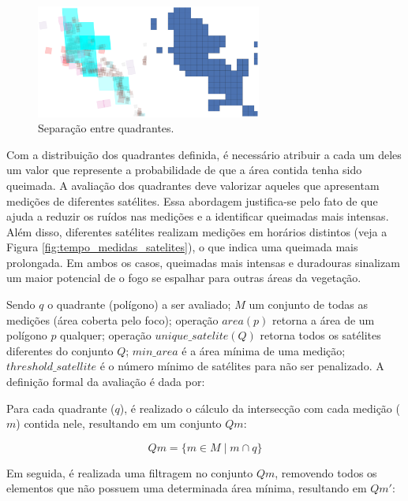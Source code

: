 \documentclass[cic,tc]{iiufrgs}
\begin{document}
\begin{figure}[H]
    \caption{Separação entre quadrantes.}
    \begin{center}
        \includegraphics[width=20em]{satellite_quads_split}
    \end{center}
    \label{fig:satellite_quads_split}
\end{figure}

Com a distribuição dos quadrantes definida, é necessário atribuir a cada um deles um valor que represente a probabilidade de que a área contida tenha sido queimada. A avaliação dos quadrantes deve valorizar aqueles que apresentam medições de diferentes satélites. Essa abordagem justifica-se pelo fato de que ajuda a reduzir os ruídos nas medições e a identificar queimadas mais intensas. Além disso, diferentes satélites realizam medições em horários distintos (veja a Figura \ref{fig:tempo_medidas_satelites}), o que indica uma queimada mais prolongada. Em ambos os casos, queimadas mais intensas e duradouras sinalizam um maior potencial de o fogo se espalhar para outras áreas da vegetação. \par

Sendo $q$ o quadrante (polígono) a ser avaliado; $M$ um conjunto de todas as medições (área coberta pelo foco); operação $area(p)$ retorna a área de um polígono $p$ qualquer; operação $unique\_satelite(Q)$ retorna todos os satélites diferentes do conjunto $Q$; $min\_area$ é a área mínima de uma medição; $threshold\_satellite$ é o número mínimo de satélites para não ser penalizado. A definição formal da avaliação é dada por: \par

Para cada quadrante ($q$), é realizado o cálculo da intersecção com cada medição ($m$) contida nele, resultando em um conjunto $Qm$: \par

\begin{equation} \label{eqn:def_qm}
Qm = \{ m \in M \mid m \cap q \}
\end{equation}

Em seguida, é realizada uma filtragem no conjunto $Qm$, removendo todos os elementos que não possuem uma determinada área mínima, resultando em $Qm'$: \par
\end{document}
